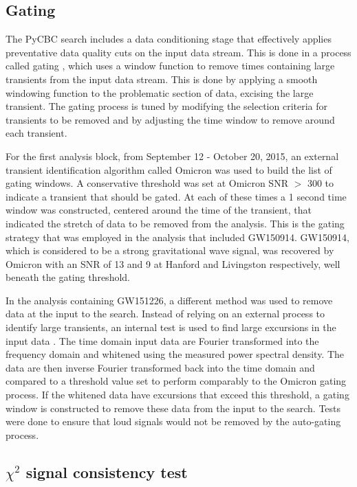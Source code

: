 \subsection{Gating}\label{sec:gating}

The PyCBC search includes a data conditioning stage that effectively applies preventative data quality
cuts on the input data stream. This is done in a process called gating \cite{Usman:2015kfa}, which uses a
window function to remove times containing large transients from the input data stream. This is done
by applying a smooth windowing function to the problematic section of data,
excising the large transient.
The gating process is tuned by modifying the selection criteria for transients to be removed and
by adjusting the time window to remove around each transient.

For the first analysis block, from September 12 - October 20, 2015, an external transient
identification algorithm called Omicron \cite{Robinet:2015om}
was used to build the list of gating windows. A conservative threshold was set at Omicron SNR $>$ 300
to indicate a transient that should be gated. At each of these times a 1 second time window was constructed,
centered around the time of the transient, that indicated the stretch of data to be removed from the analysis.
This is the gating strategy that was employed in the analysis that included GW150914.
GW150914, which is considered to be a strong gravitational wave signal, was recovered by Omicron with an SNR
of 13 and 9 at Hanford and Livingston respectively, well beneath the gating threshold.

In the analysis containing GW151226, a different method was used to remove data at the
input to the search. Instead of relying on an external process to identify large transients,
an internal test is used to find large excursions in the input data \cite{Usman:2015kfa}.
The time domain input
data are Fourier transformed into the frequency domain and whitened using the
measured power spectral density. The data are then inverse Fourier transformed back into
the time domain and compared to a threshold value set to perform comparably to the
Omicron gating process.
If the whitened data have excursions that exceed this threshold, a gating window is
constructed to remove these data from the input to the search.
Tests were done to ensure that loud signals would not be
removed by the auto-gating process.

\subsection{$\chi^{2}$ signal consistency test}\label{sec:chisq}

